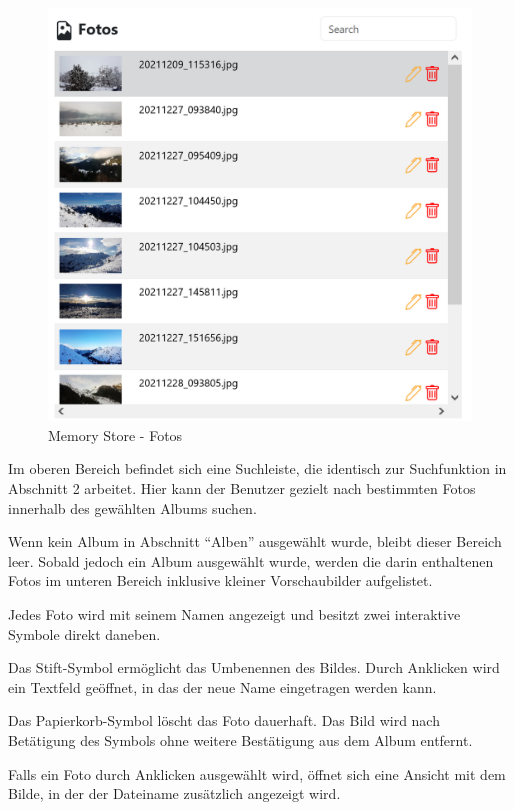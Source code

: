 \begin{figure} [h t]
    \centering
    \includegraphics[scale=0.7]{pics/memory_store_teil3.PNG}
    \caption{Memory Store - Fotos}
    \label{fig:memory-store-fotos}
\end{figure}

Im oberen Bereich befindet sich eine Suchleiste, die identisch zur Suchfunktion in 
Abschnitt 2 arbeitet. Hier kann der Benutzer gezielt nach bestimmten Fotos innerhalb 
des gewählten Albums suchen.

Wenn kein Album in Abschnitt ``Alben'' ausgewählt wurde, bleibt dieser Bereich leer. 
Sobald jedoch ein Album ausgewählt wurde, werden die darin enthaltenen Fotos im 
unteren Bereich inklusive kleiner Vorschaubilder aufgelistet.

Jedes Foto wird mit seinem Namen angezeigt und besitzt zwei interaktive Symbole direkt 
daneben.

Das Stift-Symbol ermöglicht das Umbenennen des Bildes. Durch Anklicken wird ein Textfeld 
geöffnet, in das der neue Name eingetragen werden kann.

Das Papierkorb-Symbol löscht das Foto dauerhaft. Das Bild wird nach Betätigung des Symbols 
ohne weitere Bestätigung aus dem Album entfernt.

Falls ein Foto durch Anklicken ausgewählt wird, öffnet sich eine Ansicht mit dem Bilde, 
in der der Dateiname zusätzlich angezeigt wird. 

